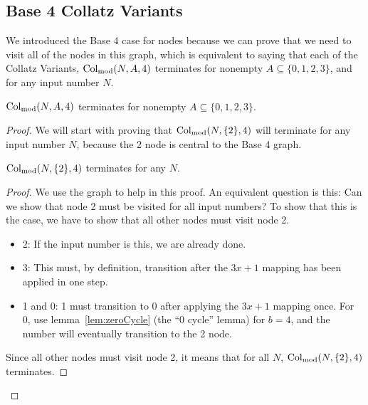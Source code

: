 \subsection{Base 4 Collatz Variants} \label{subsubsec:base4variants}
We introduced the Base 4 case for nodes because we can prove that we need to visit all of the nodes in this graph, which is equivalent to saying that each of the Collatz Variants, $\mathrm{Col}_{\text{mod}}(N,A,4)$ terminates for nonempty $A \subseteq \{0,1,2,3\}$, and for any input number $N$. 
\begin{theorem}
$\mathrm{Col}_{\text{mod}}(N,A,4)$ terminates for nonempty $A \subseteq \{0,1,2,3\}$.
\end{theorem}
\begin{proof}
We will start with proving that $\mathrm{Col}_{\text{mod}}(N,\{2\},4)$ will terminate for any input number $N$, because the 2 node is central to the Base 4 graph.\par
\begin{lemma}
\label{lem:collatzSubTwoModFour}
$\mathrm{Col}_{\text{mod}}(N,\{2\},4)$ terminates for any $N$.
\end{lemma} 
\begin{proof}
We use the graph to help in this proof. An equivalent question is this: Can we show that node 2 must be visited for all input numbers? To show that this is the case, we have to show that all other nodes must visit node 2. 
\begin{itemize}
    \item 2: If the input number is this, we are already done.
    \item 3: This must, by definition, transition after the $3x+1$ mapping has been applied in one step.
    \item 1 and 0: 1 must transition to 0 after applying the $3x+1$ mapping once. For 0, use lemma~\ref{lem:zeroCycle} (the ``0 cycle'' lemma) for $b = 4$, and the number will eventually transition to the 2 node.
\end{itemize}
Since all other nodes must visit node 2, it means that for all $N$, $\mathrm{Col}_{\text{mod}}(N,\{2\},4)$ terminates.
\end{proof} \par


\end{proof}
